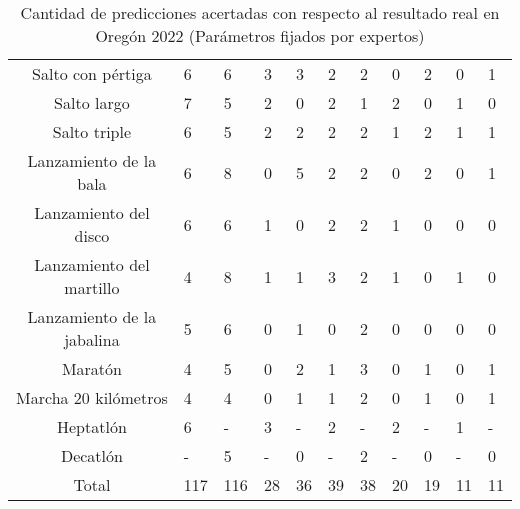 \begin{table}[H]
{\begin{tabular}{|c|P{1.3cm}|P{1.2cm}|P{1.3cm}|P{1.2cm}|P{1.4cm}|P{1.2cm}|P{1.45cm}|P{1.2cm}|P{1.3cm}|P{1.2cm}|}
            Salto con pértiga & 6 & 6 & 3 & 3 & 2 & 2 & 0 & 2 & 0 & 1 \\
            Salto largo & 7 & 5 & 2 & 0 & 2 & 1 & 2 & 0 & 1 & 0 \\
            Salto triple & 6 & 5 & 2 & 2 & 2 & 2 & 1 & 2 & 1 & 1 \\
            Lanzamiento de la bala & 6 & 8 & 0 & 5 & 2 & 2 & 0 & 2 & 0 & 1 \\
            Lanzamiento del disco & 6 & 6 & 1 & 0 & 2 & 2 & 1 & 0 & 0 & 0 \\
            Lanzamiento del martillo & 4 & 8 & 1 & 1 & 3 & 2 & 1 & 0 & 1 & 0 \\
            Lanzamiento de la jabalina & 5 & 6 & 0 & 1 & 0 & 2 & 0 & 0 & 0 & 0 \\
            Maratón & 4 & 5 & 0 & 2 & 1 & 3 & 0 & 1 & 0 & 1 \\
            Marcha 20 kilómetros & 4 & 4 & 0 & 1 & 1 & 2 & 0 & 1 & 0 & 1 \\
            Heptatlón & 6 & - & 3 & - & 2 & - & 2 & - & 1 & - \\
            Decatlón & - & 5 & - & 0 & - & 2 & - & 0 & - & 0 \\
            \hline
            Total & 117 & 116 & 28 & 36 & 39 & 38 & 20 & 19 & 11 & 11 \\ \hline
        \end{tabular}
        \caption{Cantidad de predicciones acertadas con respecto al resultado real en Oregón 2022 (Parámetros fijados por expertos)}
        \label{tab:manualoregon}
    }
\end{table}

